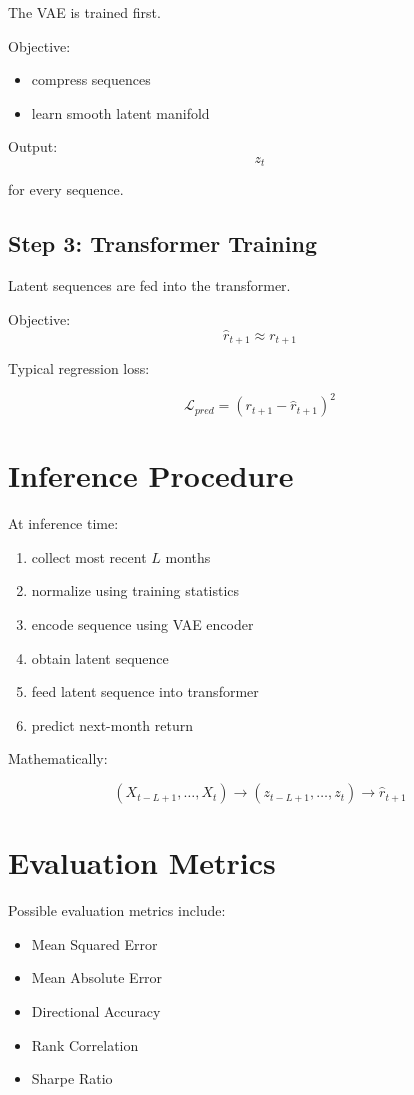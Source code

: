 \documentclass[11pt]{article}
\begin{document}
The VAE is trained first.

Objective:
\begin{itemize}
    \item compress sequences
    \item learn smooth latent manifold
\end{itemize}

Output:
\[
z_t
\]

for every sequence.

\subsection{Step 3: Transformer Training}

Latent sequences are fed into the transformer.

Objective:
\[
\hat r_{t+1}
\approx
r_{t+1}
\]

Typical regression loss:

\[
\mathcal{L}_{pred}
=
(r_{t+1} - \hat r_{t+1})^2
\]

\section{Inference Procedure}

At inference time:

\begin{enumerate}
    \item collect most recent $L$ months
    \item normalize using training statistics
    \item encode sequence using VAE encoder
    \item obtain latent sequence
    \item feed latent sequence into transformer
    \item predict next-month return
\end{enumerate}

Mathematically:

\[
(X_{t-L+1}, \dots, X_t)
\rightarrow
(z_{t-L+1}, \dots, z_t)
\rightarrow
\hat r_{t+1}
\]

\section{Evaluation Metrics}

Possible evaluation metrics include:

\begin{itemize}
    \item Mean Squared Error
    \item Mean Absolute Error
    \item Directional Accuracy
    \item Rank Correlation
    \item Sharpe Ratio
\end{itemize}
\end{document}
